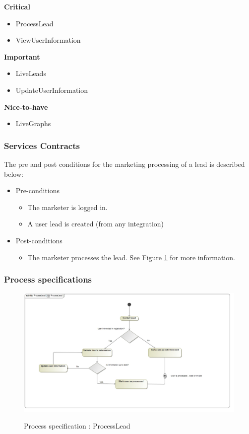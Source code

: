 \documentclass{article}
\begin{document}
		\begin{flushleft}
			\textbf{Critical}
				\begin{itemize}
					\item ProcessLead
					\item ViewUserInformation
				\end{itemize}
			\textbf{Important}
				\begin{itemize}
					\item LiveLeads
					\item UpdateUserInformation
				\end{itemize}
			\textbf{Nice-to-have}
				\begin{itemize}
					\item LiveGraphs
				\end{itemize}
		\end{flushleft}

		\subsubsection{Services Contracts}
		The pre and post conditions for the marketing processing of a lead is described below:
		\begin{itemize}
				\item Pre-conditions
				\begin{itemize}
					\item The marketer is logged in.
					\item A user lead is created (from any integration)
				\end{itemize}
			\item Post-conditions
				\begin{itemize}
					\item The marketer processes the lead. See Figure \ref{fig:processLead} for more information.
				\end{itemize}
		\end{itemize}

		
		\subsubsection{Process specifications}
		\begin{figure}[H]
		\includegraphics[width=18cm]{images/marketingProcess.jpg}  \\
		\caption{Process specification : ProcessLead}
		\label{fig:processLead}
		\end{figure}
\end{document}
